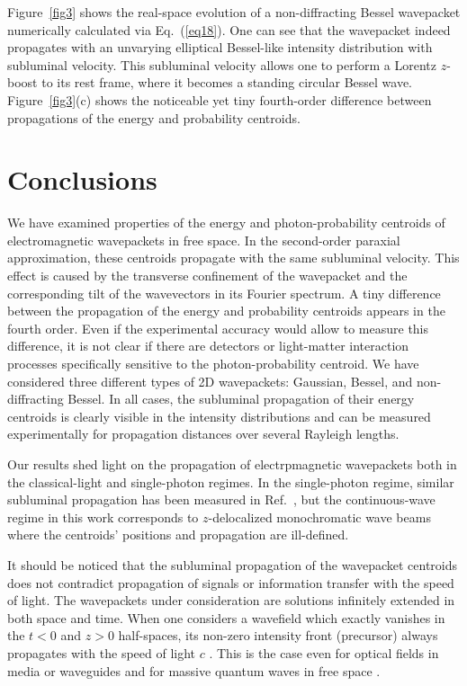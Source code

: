 \documentclass[12pt, a4paper, superscriptaddress, final]{iopart}
\begin{document}
Figure~\ref{fig3} shows the real-space evolution of a non-diffracting Bessel wavepacket numerically calculated via Eq.~(\ref{eq18}). 
One can see that the wavepacket indeed propagates with an unvarying elliptical Bessel-like intensity distribution with subluminal velocity. This subluminal velocity allows one to perform a Lorentz $z$-boost to its rest frame, where it becomes a standing circular Bessel wave. Figure~\ref{fig3}(c) shows the noticeable yet tiny fourth-order difference between propagations of the energy and probability centroids.


\section{Conclusions}
We have examined properties of the energy and photon-probability centroids of electromagnetic wavepackets in free space. In the second-order paraxial approximation, these centroids propagate with the same subluminal velocity. This effect is caused by the transverse confinement of the wavepacket and the corresponding tilt of the wavevectors in its Fourier spectrum. A tiny difference between the propagation of the energy and probability centroids appears in the fourth order. Even if the experimental accuracy would allow to measure this difference, it is not clear if there are detectors or light-matter interaction processes specifically sensitive to the photon-probability centroid. We have considered three different types of 2D wavepackets: Gaussian, Bessel, and non-diffracting Bessel. In all cases, the subluminal propagation of their energy centroids is clearly visible in the intensity distributions and can be measured experimentally for propagation distances over several Rayleigh lengths.

Our results shed light on the propagation of electrpmagnetic wavepackets both in the classical-light and single-photon regimes. In the single-photon regime, similar subluminal propagation has been measured in Ref.~\cite{Giovannini2015}, but the continuous-wave regime in this work corresponds to $z$-delocalized monochromatic wave beams where the centroids' positions and propagation are ill-defined. 

It should be noticed that the subluminal propagation of the wavepacket centroids does not contradict  propagation of signals or information transfer with the speed of light. The wavepackets under consideration are solutions infinitely extended in both space and time. When one considers a wavefield which exactly vanishes in the $t<0$ and $z>0$ half-spaces, its non-zero intensity front (precursor) always propagates with the speed of light $c$ \cite{Brillouin_book,Sommerfeld_book}. This is the case even for optical fields in media or waveguides \cite{Brillouin_book,Sommerfeld_book,Pleshko1969,Aaviksoo1991} and for massive quantum waves in free space \cite{Berry2012_II,Bliokh2018}.    
\end{document}
